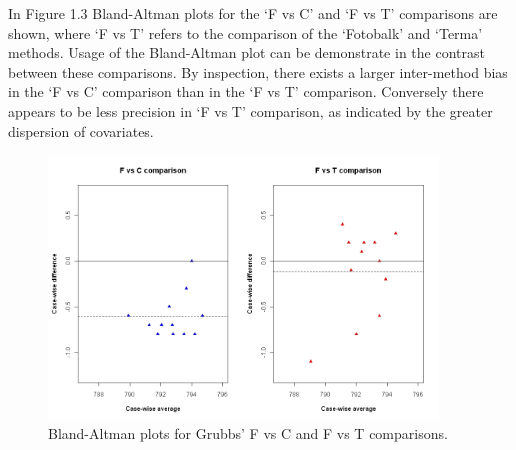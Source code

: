 \documentclass[12pt, a4paper]{report}
\theoremstyle{plain}
\theoremstyle{definition}
\theoremstyle{remark}
\begin{document}
	
	
	In Figure 1.3 Bland-Altman plots for the `F vs C' and `F vs T'
	comparisons are shown, where `F vs T' refers to the comparison of
	the `Fotobalk' and `Terma' methods. Usage of the Bland-Altman plot
	can be demonstrate in the contrast between these comparisons. By inspection, there exists a larger inter-method bias in the `F vs C' comparison than in the `F vs T' comparison. Conversely there
	appears to be less precision in `F vs T' comparison, as indicated
	by the greater dispersion of covariates.
	
	\begin{figure}[h!]
		\begin{center}
			\includegraphics[height=70mm]{images/GrubbsDataTwoBAplots.jpeg}
			\caption{Bland-Altman plots for Grubbs' F vs C and F vs T comparisons.}\label{GrubbsDataTwoBAplots}
		\end{center}
	\end{figure}
	
	\newpage
	
	
	
	
	
	
	
	
\end{document}
